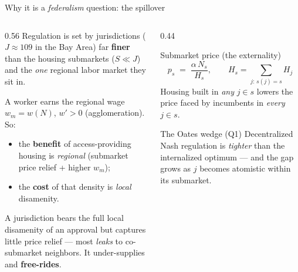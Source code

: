\documentclass[10pt,aspectratio=169]{beamer}
\begin{document}
\begin{frame}{Why it is a \emph{federalism} question: the spillover}
\begin{columns}[T]
\begin{column}{0.56\textwidth}
Regulation is set by jurisdictions ($J\!\approx\!109$ in the Bay Area) far \textbf{finer} than the
housing submarkets ($S\!\ll\!J$) and the \emph{one} regional labor market they sit in.
\medskip

A worker earns the regional wage $w_m=w(N)$, $w'>0$ (agglomeration). So:
\begin{itemize}
  \item the \textbf{benefit} of access-providing housing is \emph{regional}
  (submarket price relief + higher $w_m$);
  \item the \textbf{cost} of that density is \emph{local} disamenity.
\end{itemize}
\medskip
A jurisdiction bears the full local disamenity of an approval but captures little price relief
--- most \emph{leaks} to co-submarket neighbors. It under-supplies and \textbf{free-rides}.
\end{column}
\begin{column}{0.44\textwidth}
\begin{block}{Submarket price (the externality)}
\[ p_{s} \;=\; \frac{\alpha\, N_{s}}{H_{s}}, \qquad H_s=\!\!\sum_{j:\,s(j)=s}\!\!H_j \]
Housing built in \emph{any} $j\in s$ lowers the price faced by incumbents in \emph{every}
$j\in s$.
\end{block}
\begin{exampleblock}{The Oates wedge (Q1)}
Decentralized Nash regulation is \emph{tighter} than the internalized optimum --- and the gap
grows as $j$ becomes atomistic within its submarket.
\end{exampleblock}
\end{column}
\end{columns}
\end{frame}
\end{document}
